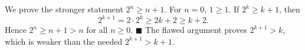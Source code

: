 We prove the stronger statement $2^n\ge n+1$. For $n=0$, $1\ge1$. If $2^k\ge k+1$, then
\[2^{k+1}=2\cdot2^k\ge2k+2\ge k+2.\]
Hence $2^n\ge n+1>n$ for all $n\ge0$. $\blacksquare$ The flawed argument proves $2^{k+1}>k$, which is weaker than the needed $2^{k+1}>k+1$.
